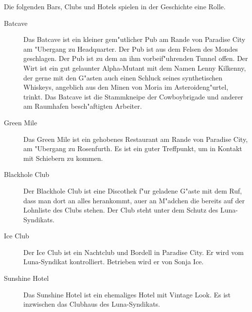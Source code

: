 
Die folgenden Bars, Clubs und Hotels spielen in der Geschichte eine Rolle.

\begin{description}
    \item [Batcave] Das Batcave ist ein kleiner gem"utlicher Pub am Rande von Paradise City am "Ubergang zu Headquarter. Der Pub ist aus 
        dem Felsen des Mondes geschlagen. Der Pub ist zu dem an ihm vorbeif"uhrenden Tunnel offen. Der Wirt ist ein gut gelaunter Alpha-Mutant mit dem Namen Lenny Kilkenny, der gerne mit den G"asten auch einen Schluck seines synthetischen Whiskeys, angeblich aus den Minen von Moria im Asteroideng"urtel, trinkt. Das Batcave ist die Stammkneipe der Cowboybrigade und anderer am Raumhafen besch"aftigten Arbeiter.
    \item [Green Mile] Das Green Mile ist ein gehobenes Restaurant am Rande von Paradise City, am "Ubergang zu Rosenfurth.  Es ist ein 
        guter Treffpunkt, um in Kontakt mit Schiebern zu kommen.
    \item [Blackhole Club] Der Blackhole Club ist eine Discothek f"ur geladene G"aste mit dem Ruf, dass man dort an alles herankommt, au\3er 
        an M"adchen die bereits auf der Lohnliste des Clubs stehen. Der Club steht unter dem Schutz des Luna-Syndikats.    
    \item [Ice Club] Der Ice Club ist ein Nachtclub und Bordell in Paradise City. Er wird vom Luna-Syndikat kontrolliert. Betrieben wird 
        er von Sonja Ice.
    \item [Sunshine Hotel] Das Sunshine Hotel ist ein ehemaliges Hotel mit Vintage Look. Es ist inzwischen das Clubhaus des 
        Luna-Syndikats.    
\end{description}
